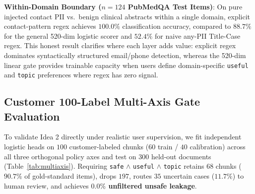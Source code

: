 \documentclass{article}
\begin{document}
\textbf{Within-Domain Boundary ($n=124$ PubMedQA Test Items)}: On pure injected contact PII vs.\ benign clinical abstracts within a single domain, explicit contact-pattern regex achieves $100.0\%$ classification accuracy, compared to $88.7\%$ for the general 520-dim logistic scorer and $52.4\%$ for naive any-PII Title-Case regex. This honest result clarifies where each layer adds value: explicit regex dominates syntactically structured email/phone detection, whereas the 520-dim linear gate provides trainable capacity when users define domain-specific \texttt{useful} and \texttt{topic} preferences where regex has zero signal.

\subsection{Customer 100-Label Multi-Axis Gate Evaluation}
To validate Idea 2 directly under realistic user supervision, we fit independent logistic heads on $100$ customer-labeled chunks ($60$ train / $40$ calibration) across all three orthogonal policy axes and test on $300$ held-out documents (Table~\ref{tab:multiaxis}). Requiring \texttt{safe} $\land$ \texttt{useful} $\land$ \texttt{topic} retains $68$ chunks ($90.7\%$ of gold-standard items), drops $197$, routes $35$ uncertain cases ($11.7\%$) to human review, and achieves \textbf{$0.0\%$ unfiltered unsafe leakage}.

\begin{table}[t]
\caption{Customer-label multi-axis gatekeeper evaluation ($60$ train + $40$ cal $\to$ $300$ held-out test). Conjunction passes only \texttt{safe} $\land$ \texttt{useful} $\land$ \texttt{topic}.}
\label{tab:multiaxis}
\vskip 0.08in
\begin{center}
\end{center}
\vskip -0.14in
\end{table}
\end{document}
